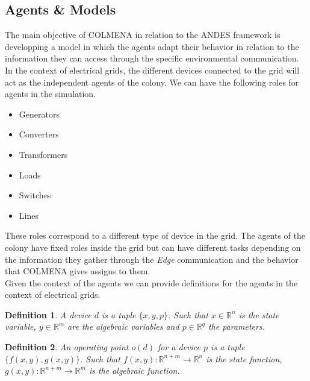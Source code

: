 \documentclass{report}
\newtheorem{definition}{Definition}
\begin{document}
\subsection{Agents \& Models}

The main objective of COLMENA in relation to the ANDES framework is developping a model in which the agents adapt their behavior in relation to the information they can access through the specific environmental communication. In the context of electrical grids, the different devices connected to the grid will act as the independent agents of the colony. We can have the following roles for agents in the simulation. \\

\begin{itemize}
    \item Generators
    \item Converters
    \item Transformers
    \item Loads
    \item Switches 
    \item Lines
\end{itemize}

These roles correspond to a different type of device in the grid. The agents of the colony have fixed roles inside the grid but can have different tasks depending on the information they gather through the \textit{Edge} communication and the behavior that COLMENA gives assigns to them. \\

Given the context of the agents we can provide definitions for the agents in the context of electrical grids.

\begin{definition}
    A device $d$ is a tuple $\{x, y, p\}$. Such that $x \in \mathbb{R}^n$ is the state variable,
    $y \in \mathbb{R}^m$ are the algebraic variables and $p \in \mathbb{R}^q$ the parameters. 
\end{definition}

\begin{definition}
    An operating point $o(d)$ for a device $p$ is a tuple $\{f(x,y), g(x,y)\}$. Such that $f(x,y) : \mathbb{R}^{n+m} \rightarrow \mathbb{R}^n$ is the state function, $g(x,y) : \mathbb{R}^{n+m} \rightarrow \mathbb{R}^m$ is the algebraic function.
\end{definition}
\end{document}

